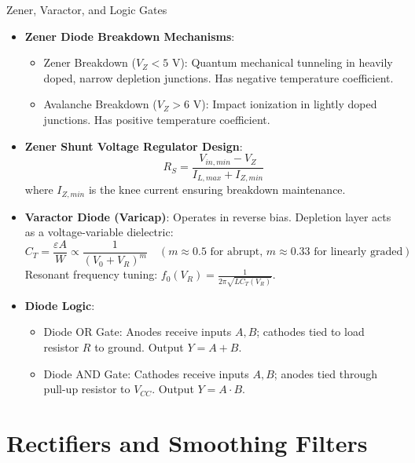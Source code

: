 \begin{formulabox}{Zener, Varactor, and Logic Gates}
\begin{itemize}[leftmargin=1.5em]
    \item \textbf{Zener Diode Breakdown Mechanisms}:
    \begin{itemize}
        \item Zener Breakdown ($V_Z < 5\text{ V}$): Quantum mechanical tunneling in heavily doped, narrow depletion junctions. Has negative temperature coefficient.
        \item Avalanche Breakdown ($V_Z > 6\text{ V}$): Impact ionization in lightly doped junctions. Has positive temperature coefficient.
    \end{itemize}
    \item \textbf{Zener Shunt Voltage Regulator Design}:
    \[ R_S = \frac{V_{in,min} - V_Z}{I_{L,max} + I_{Z,min}} \]
    where $I_{Z,min}$ is the knee current ensuring breakdown maintenance.
    \item \textbf{Varactor Diode (Varicap)}:
    Operates in reverse bias. Depletion layer acts as a voltage-variable dielectric:
    \[ C_T = \frac{\varepsilon A}{W} \propto \frac{1}{(V_0 + V_R)^m} \quad (m \approx 0.5 \text{ for abrupt, } m \approx 0.33 \text{ for linearly graded}) \]
    Resonant frequency tuning: $f_0(V_R) = \frac{1}{2\pi\sqrt{L C_T(V_R)}}$.
    \item \textbf{Diode Logic}:
    \begin{itemize}
        \item Diode OR Gate: Anodes receive inputs $A, B$; cathodes tied to load resistor $R$ to ground. Output $Y = A + B$.
        \item Diode AND Gate: Cathodes receive inputs $A, B$; anodes tied through pull-up resistor to $V_{CC}$. Output $Y = A \cdot B$.
    \end{itemize}
\end{itemize}
\end{formulabox}

\section{Rectifiers and Smoothing Filters}

